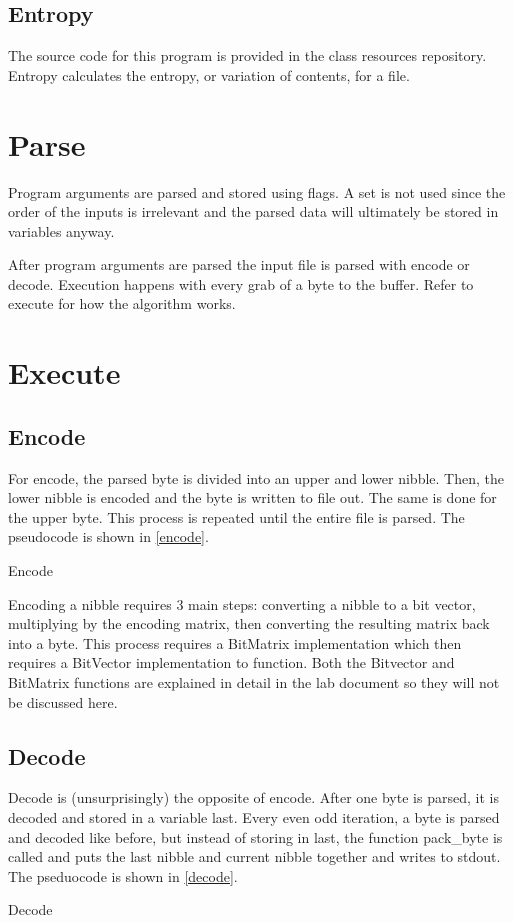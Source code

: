 \documentclass[12pt]{article}
\begin{document}
\subsection{Entropy}

The source code for this program is provided in the class resources repository.
Entropy calculates the entropy, or variation of contents, for a file.

\section{Parse}

Program arguments are parsed and stored using flags.
A set is not used since the order of the inputs is irrelevant and the parsed data
will ultimately be stored in variables anyway.

After program arguments are parsed the input file is parsed with encode or decode.
Execution happens with every grab of a byte to the buffer.
Refer to execute for how the algorithm works.

\section{Execute}

\subsection{Encode}

For encode, the parsed byte is divided into an upper and lower nibble. 
Then, the lower nibble is encoded and the byte is written to file out.
The same is done for the upper byte.
This process is repeated until the entire file is parsed. The pseudocode
is shown in \vref{encode}.

\begin{algorithm}
    \caption{Encode}\label{encode}
\end{algorithm}

Encoding a nibble requires 3 main steps: converting a nibble to a bit
vector, multiplying by the encoding matrix, then converting the resulting
matrix back into a byte. This process requires a BitMatrix implementation which then 
requires a BitVector implementation to function.
Both the Bitvector and BitMatrix functions are explained in detail in the lab document
so they will not be discussed here.

\subsection{Decode}

Decode is (unsurprisingly) the opposite of encode. After one byte is
parsed, it is decoded and stored in a variable last.
Every even odd iteration, a byte is parsed and decoded like before,
but instead of storing in last, the function pack\_byte is called
and puts the last nibble and current nibble together and writes to
stdout.
The pseduocode is shown in \vref{decode}.

\begin{algorithm}
    \caption{Decode}\label{decode}
\end{algorithm}
\end{document}
